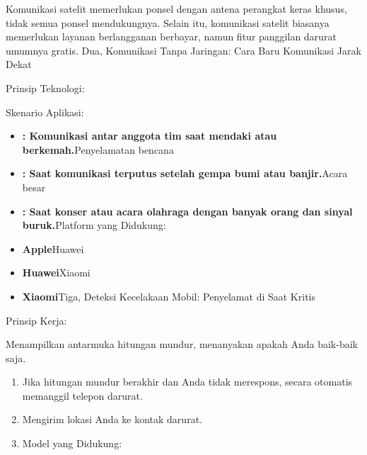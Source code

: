 \begin{tcbinfo}{Komunikasi satelit memerlukan ponsel dengan antena perangkat keras khusus, tidak semua ponsel mendukungnya. Selain itu, komunikasi satelit biasanya memerlukan layanan berlangganan berbayar, namun fitur panggilan darurat umumnya gratis.}
Dua, Komunikasi Tanpa Jaringan: Cara Baru Komunikasi Jarak Dekat

\end{tcbinfo}


Prinsip Teknologi:


Skenario Aplikasi:


\begin{itemize}
  \item \textbf{: Komunikasi antar anggota tim saat mendaki atau berkemah.}Penyelamatan bencana
  \item \textbf{: Saat komunikasi terputus setelah gempa bumi atau banjir.}Acara besar
  \item \textbf{: Saat konser atau acara olahraga dengan banyak orang dan sinyal buruk.}Platform yang Didukung:
\end{itemize}


\begin{itemize}
  \item \textbf{Apple}Huawei
  \item \textbf{Huawei}Xiaomi
  \item \textbf{Xiaomi}Tiga, Deteksi Kecelakaan Mobil: Penyelamat di Saat Kritis
\end{itemize}


Prinsip Kerja:


Menampilkan antarmuka hitungan mundur, menanyakan apakah Anda baik-baik saja.

\begin{enumerate}
  \item Jika hitungan mundur berakhir dan Anda tidak merespons, secara otomatis memanggil telepon darurat.
  \item Mengirim lokasi Anda ke kontak darurat.
  \item Model yang Didukung:
\end{enumerate}

